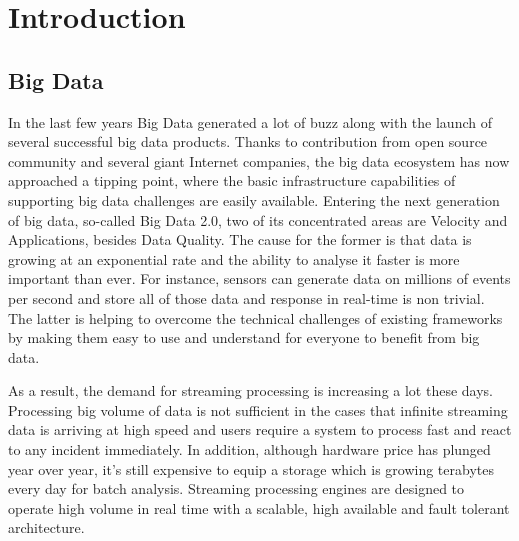 
\chapter{Introduction}

\ifpdf
    \graphicspath{{Chapter1/Figs/Raster/}{Chapter1/Figs/PDF/}{Chapter1/Figs/}}
\else
    \graphicspath{{Chapter1/Figs/Vector/}{Chapter1/Figs/}}
\fi


\section*{Big Data}
In the last few years Big Data generated a lot of buzz along with the launch of several successful big data products. Thanks to contribution from open source community and several giant Internet companies, the big data ecosystem has now approached a tipping point, where the basic infrastructure capabilities of supporting big data challenges are easily available. Entering the next generation of big data, so-called Big Data 2.0, two of its concentrated areas are Velocity and Applications, besides Data Quality. The cause for the former is that data is growing at an exponential rate and the ability to analyse it faster is more important than ever. For instance, sensors can generate data on millions of events per second and store all of those data and response in real-time is non trivial. The latter is helping to overcome the technical challenges of existing frameworks by making them easy to use and understand for everyone to benefit from big data.

As a result, the demand for streaming processing is increasing a lot these days. Processing big volume of data is not sufficient in the cases that infinite streaming data is arriving at high speed and users require a system to process fast and react to any incident immediately. In addition, although hardware price has plunged year over year, it’s still expensive to equip a storage which is growing terabytes every day for batch analysis.  Streaming processing engines are designed to operate high volume in real time with a scalable, high available and fault tolerant architecture.




